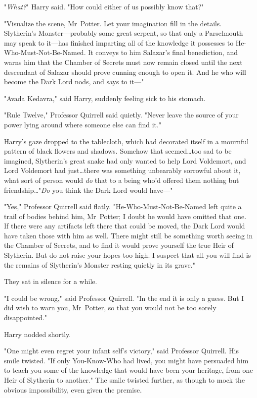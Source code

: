 "\emph{What?}" Harry said. "How could either of us possibly know that?"

"Visualize the scene, Mr~Potter. Let your imagination fill in the details.
Slytherin's Monster—probably some great serpent, so that only a Parselmouth
may speak to it—has finished imparting all of the knowledge it possesses to
He-Who-Must-Not-Be-Named. It conveys to him Salazar's final benediction, and
warns him that the Chamber of Secrets must now remain closed until the next
descendant of Salazar should prove cunning enough to open it. And he who will
become the Dark Lord nods, and says to it—"

"Avada Kedavra," said Harry, suddenly feeling sick to his stomach.

"Rule Twelve," Professor Quirrell said quietly. "Never leave the source of your
power lying around where someone else can find it."

Harry's gaze dropped to the tablecloth, which had decorated itself in a
mournful pattern of black flowers and shadows. Somehow that seemed…too
sad to be imagined, Slytherin's great snake had only wanted to help Lord
Voldemort, and Lord Voldemort had just…there was something unbearably
sorrowful about it, what sort of person would \emph{do} that to a being who'd
offered them nothing but friendship…"\emph{Do} you think the Dark Lord
would have—"

"Yes," Professor Quirrell said flatly. "He-Who-Must-Not-Be-Named left quite a
trail of bodies behind him, Mr~Potter; I doubt he would have omitted that one.
If there were any artifacts left there that could be moved, the Dark Lord would
have taken those with him as well. There might still be something worth seeing
in the Chamber of Secrets, and to find it would prove yourself the true Heir of
Slytherin. But do not raise your hopes too high. I suspect that all you will
find is the remains of Slytherin's Monster resting quietly in its grave."

They sat in silence for a while.

"I could be wrong," said Professor Quirrell. "In the end it is only a guess.
But I did wish to warn you, Mr~Potter, so that you would not be too sorely
disappointed."

Harry nodded shortly.

"One might even regret your infant self's victory," said Professor Quirrell.
His smile twisted. "If only You-Know-Who had lived, you might have persuaded
him to teach you some of the knowledge that would have been your heritage, from
one Heir of Slytherin to another." The smile twisted further, as though to mock
the obvious impossibility, even given the premise.

